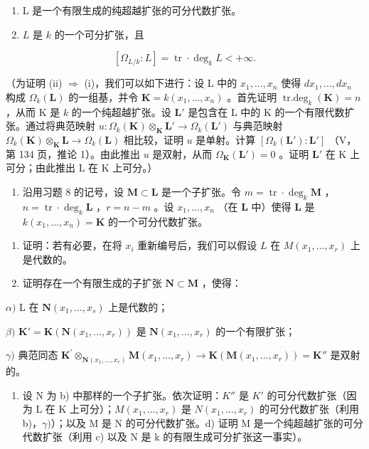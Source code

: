 \begin{enumerate}
\def\labelenumi{(\roman{enumi})}
\item
  L 是一个有限生成的纯超越扩张的可分代数扩张。
\item
  \(L\) 是 \(k\) 的一个可分扩张，且
\end{enumerate}

\[
[ \Omega_ {L / k}: L ] = \operatorname{tr} \cdot \deg_ {k} L <   + \infty .
\]

（为证明 (ii) \(\Rightarrow\) (i)，我们可以如下进行：设 L 中的 \(x_{1},\ldots ,x_{n}\) 使得 \(dx_{1},\ldots ,dx_{n}\) 构成 \(\Omega_k(\mathbf{L})\) 的一组基，并令 \(\mathbf{K} = k(x_1,\dots,x_n)\) 。首先证明 \(\operatorname {tr.deg}_k(\mathbf{K}) = n\) ，从而 K 是 \(k\) 的一个纯超越扩张。设 \(\mathbf{L}'\) 是包含在 L 中的 K 的一个有限代数扩张。通过将典范映射 \(u:\Omega_k(\mathbf{K})\otimes_\mathbf{K}\mathbf{L}'\to \Omega_k(\mathbf{L}')\) 与典范映射 \(\Omega_k(\mathbf{K})\otimes_\mathbf{K}\mathbf{L}\to \Omega_k(\mathbf{L})\) 相比较，证明 \(u\) 是单射。计算 \([\Omega_k(\mathbf{L}'):\mathbf{L}']\) （V，第 134 页，推论 1）。由此推出 \(u\) 是双射，从而 \(\Omega_{\mathbf{K}}(\mathbf{L}') = 0\) 。证明 \(\mathbf{L}'\) 在 K 上可分；由此推出 L 在 K 上可分。）

\begin{enumerate}
\def\labelenumi{\arabic{enumi})}
\setcounter{enumi}{8}
\tightlist
\item
  沿用习题 8 的记号，设 \(\mathbf{M} \subset \mathbf{L}\) 是一个子扩张。令 \(m = \operatorname{tr} \cdot \deg_k \mathbf{M}\) ，\(n = \operatorname{tr} \cdot \deg_k \mathbf{L}\) ，\(r = n - m\) 。设 \(x_1, \ldots, x_n\) （在 \(\mathbf{L}\) 中）使得 \(\mathbf{L}\) 是 \(k(x_1, \ldots, x_n) = \mathbf{K}\) 的一个可分代数扩张。
\end{enumerate}

\begin{enumerate}
\def\labelenumi{\alph{enumi})}
\item
  证明：若有必要，在将 \(x_{i}\) 重新编号后，我们可以假设 \(L\) 在 \(M(x_{1},\ldots ,x_{r})\) 上是代数的。
\item
  证明存在一个有限生成的子扩张 \(\mathbf{N} \subset \mathbf{M}\) ，使得：
\end{enumerate}

\(\alpha)\) L 在 \(\mathbf{N}(x_1,\dots,x_s)\) 上是代数的；

\(\beta)\) \(\mathbf{K}' = \mathbf{K}(\mathbf{N}(x_1,\dots,x_r))\) 是 \(\mathbf{N}(x_1,\dots,x_r)\) 的一个有限扩张；

\(\gamma)\) 典范同态 \(\mathbf{K}^{\prime}\otimes_{\mathbf{N}(x_1,\ldots ,x_r)}\mathbf{M}(x_1,\dots,x_r)\to \mathbf{K}(\mathbf{M}(x_1,\dots,x_r)) = \mathbf{K}''\) 是双射的。

\begin{enumerate}
\def\labelenumi{\alph{enumi})}
\setcounter{enumi}{2}
\tightlist
\item
  设 N 为 b) 中那样的一个子扩张。依次证明：\(K''\) 是 \(K'\) 的可分代数扩张（因为 L 在 K 上可分）；\(M(x_{1}, \ldots, x_{r})\) 是 \(N(x_{1}, \ldots, x_{r})\) 的可分代数扩张（利用 b)，\(\gamma)\)）；以及 M 是 N 的可分代数扩张。d) 证明 M 是一个纯超越扩张的可分代数扩张（利用 c) 以及 N 是 k 的有限生成可分扩张这一事实）。
\end{enumerate}

